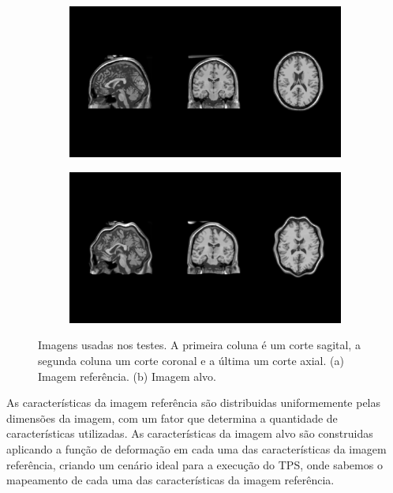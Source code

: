 \begin{figure}[H]
    \centering
    \begin{subfigure}[t]{0.8\textwidth}
      \includegraphics[width=\textwidth]{figuras/referenceImg.png}
      \label{fig:refImg}
    \end{subfigure}
    \begin{subfigure}[t]{0.8\textwidth}
      \includegraphics[width=\textwidth]{figuras/targetImg.png}
      \label{fig:tarImg}
    \end{subfigure}
    \caption{Imagens usadas nos testes. A primeira coluna é um corte sagital,
             a segunda coluna um corte coronal e a última um corte axial.
             (a) Imagem referência. (b) Imagem alvo.}
    \label{fig:testImg}
\end{figure}

  As características da imagem referência são distribuidas uniformemente pelas
dimensões da imagem, com um fator que determina a quantidade de características
utilizadas. As características da imagem alvo são construidas aplicando a
função de deformação em cada uma das características da imagem referência,
criando um cenário ideal para a execução do TPS, onde sabemos o mapeamento de
cada uma das características da imagem referência.

